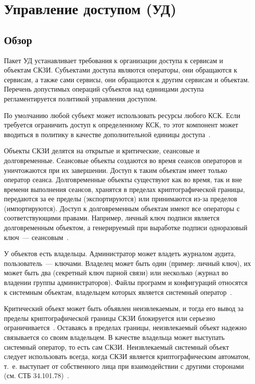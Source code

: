 \section{Управление доступом (УД)}\label{AC}

\subsection{Обзор}\label{AC.Intro}

Пакет УД устанавливает требования к организации доступа к сервисам и объектам 
СКЗИ.
%
Субъектами доступа являются операторы, они обращаются к сервисам, 
а также сами сервисы, они обращаются к другим сервисам и объектам.
%
Перечень допустимых операций субъектов над единицами доступа 
регламентируется политикой управления доступом.

По умолчанию любой субъект может использовать ресурсы любого КСК. Если требуется
ограничить доступ к определенному КСК, то этот компонент может вводиться в
политику в качестве дополнительной единицы доступа~.

Объекты СКЗИ делятся на открытые и критические, сеансовые и долговременные.
%
Сеансовые объекты создаются во время сеансов операторов и уничтожаются
при их завершении. Доступ к таким объектам имеет только оператор сеанса.
%
Долговременные объекты существуют как во время, так и вне времени выполнения
сеансов, хранятся в пределах криптографической границы, передаются за ее
пределы (экспортируются) или принимаются из-за пределов (импортируются).
%
Доступ к долговременным объектам имеют все операторы с соответствующими 
правами. Например, личный ключ подписи является долговременным объектом, а 
генерируемый при выработке подписи одноразовый ключ~--- 
сеансовым~.

У объектов есть владельцы. 
%
Администратор может владеть журналом аудита, 
пользователь~--- ключами.
%
Владелец может быть один (пример: личный ключ),
их может быть два (секретный ключ парной связи) или несколько 
(журнал во владении группы администраторов).
%
Файлы программ и конфигураций относятся к системным объектам,
владельцем которых является системный оператор~.

Критический объект может быть объявлен неизвлекаемым, и тогда его 
вывод за пределы криптографической границы СКЗИ блокируется или серьезно 
ограничивается~. Оставаясь в пределах границы, 
неизвлекаемый объект надежно связывается со своим владельцем. В качестве 
владельца может выступать системный оператор, то есть сам СКЗИ. Неизвлекаемый 
системный объект следует использовать всегда, когда СКЗИ является 
криптографическим автоматом, т.~е. выступает от собственного лица при 
взаимодействии с другими сторонами (см. СТБ 34.101.78)~.


